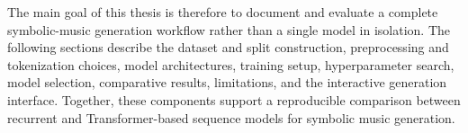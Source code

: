 The main goal of this thesis is therefore to document and evaluate a complete
symbolic-music generation workflow rather than a single model in isolation. The
following sections describe the dataset and split construction, preprocessing
and tokenization choices, model architectures, training setup, hyperparameter
search, model selection, comparative results, limitations, and the interactive
generation interface. Together, these components support a reproducible
comparison between recurrent and Transformer-based sequence models for symbolic
music generation.
